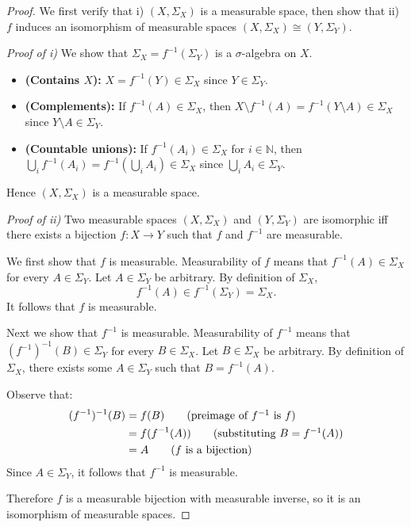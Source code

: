 \begin{proof}
	We first verify that i) $(X, \Sigma_X)$ is a measurable space, then show that ii) $f$ induces an isomorphism of measurable spaces $(X,\Sigma_X) \cong (Y,\Sigma_Y)$.

	\medskip

	\emph{Proof of i)}
	We show that 
	$\Sigma_X = f^{-1}(\Sigma_Y)$ is a $\sigma$-algebra on $X$.

	\begin{itemize}
		\item \textbf{(Contains $X$):} $X = f^{-1}(Y) \in \Sigma_X$ since $Y \in \Sigma_Y$.
		\item \textbf{(Complements):} If $f^{-1}(A) \in \Sigma_X$, then 
			$X \setminus f^{-1}(A) = f^{-1}(Y \setminus A) \in \Sigma_X$ 
			since $Y \setminus A \in \Sigma_Y$.
		\item \textbf{(Countable unions):} If $f^{-1}(A_i) \in \Sigma_X$ for 
			$i \in \mathbb{N}$, then $\bigcup_i f^{-1}(A_i) = 
			f^{-1}\!\left(\bigcup_i A_i\right) \in \Sigma_X$ since 
			$\bigcup_i A_i \in \Sigma_Y$.
	\end{itemize}

	Hence $(X, \Sigma_X)$ is a measurable space.

	\medskip

	\emph{Proof of ii)}
	Two measurable spaces $(X,\Sigma_X)$ and $(Y,\Sigma_Y)$ are isomorphic iff there exists a bijection $f \colon X \to Y$ such that $f$ and $f^{-1}$ are measurable.

	We first show that $f$ is measurable. Measurability of $f$ means that $f^{-1}(A)\in \Sigma_X$ for every $A\in \Sigma_Y$. Let $A \in \Sigma_Y$ be arbitrary. By definition of $\Sigma_X$,
	\[
	f^{-1}(A) \in f^{-1}(\Sigma_Y) = \Sigma_X.
	\]
	It follows that $f$ is measurable.
	
	Next we show that $f^{-1}$ is measurable. Measurability of $f^{-1}$ means that $(f^{-1})^{-1}(B)\in \Sigma_Y$ for every $B\in \Sigma_X$. Let $B \in \Sigma_X$ be arbitrary. By definition of $\Sigma_X$, there exists some $A \in \Sigma_Y$ such that $B = f^{-1}(A)$.

	Observe that:
	\begin{align*}
		(f^{-1})^{-1}(B) &= f(B) \tag{preimage of $f^{-1}$ is $f$} \\
		&= f(f^{-1}(A)) \tag{substituting $B = f^{-1}(A)$} \\
		&= A \tag{$f$ is a bijection}
	\end{align*}
	Since $A \in \Sigma_Y$, it follows that $f^{-1}$ is measurable.
	
	Therefore $f$ is a measurable bijection with measurable inverse, so it is an isomorphism of measurable spaces.
\end{proof}

